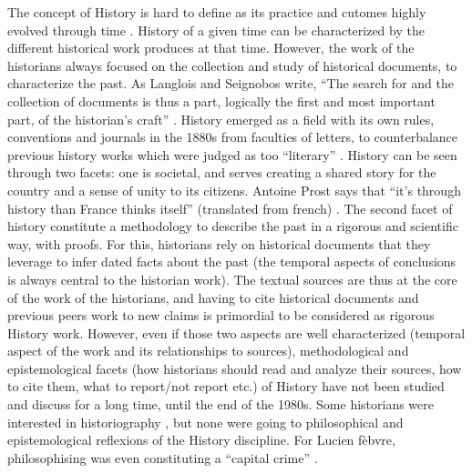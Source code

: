 The concept of History is hard to define as its practice and cutomes highly evolved through time \cite{prost2014}.
History of a given time can be characterized by the different historical work produces at that time.
However, the work of the historians always focused on the collection and study of historical documents, to characterize the past.
As Langlois and Seignobos write, ``The search for and the collection of documents is thus a part, logically the first and most important part, of the historian's craft'' \cite{langloisIntroductionAuxÉtudes2014}.
History emerged as a field with its own rules, conventions and journals in the 1880s from faculties of letters, to counterbalance previous history works which were judged as too ``literary'' \cite{noirielNaissanceMétierHistorien1990}.
History can be seen through two facets: one is societal, and serves creating a shared story for the country and a sense of unity to its citizens.
Antoine Prost says that ``it's through history than France thinks itself'' (translated from french) \cite{prost2014}.
The second facet of history constitute a methodology to describe the past in a rigorous and scientific way, with proofs.
For this, historians rely on historical documents that they leverage to infer dated facts about the past (the temporal aspects of conclusions is always central to the historian work).
The textual sources are thus at the core of the work of the historians, and having to cite historical documents and previous peers work to new claims is primordial to be considered as rigorous History work.
However, even if those two aspects are well characterized (temporal aspect of the work and its relationships to sources), methodological and epistemological facets (how historians should read and analyze their sources, how to cite them, what to report/not report etc.) of History have not been studied and discuss for a long time, until the end of the 1980s.
Some historians were interested in historiography \cite{carbonellHistoriographie1981}, but none were going to philosophical and epistemological reflexions of the History discipline.
For Lucien fèbvre, philosophising was even constituting a ``capital crime'' \cite{febvreVERSAUTREHISTOIRE1949, prost2014}.

